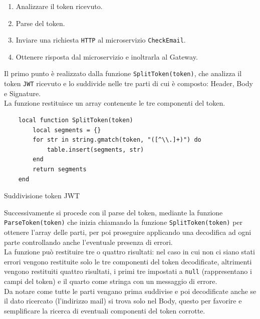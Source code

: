 \begin{enumerate}
	\item Analizzare il token ricevuto.
	\item Parse del token.
	\item Inviare una richiesta \texttt{HTTP} al microservizio \texttt{CheckEmail}.
	\item Ottenere risposta dal microservizio e inoltrarla al Gateway.
\end{enumerate}

Il primo punto è realizzato dalla funzione \texttt{SplitToken(token)}, che analizza il token \texttt{JWT} ricevuto e lo suddivide nelle tre parti di cui è composto: Header, Body e Signature.\\
La funzione restituisce un array contenente le tre componenti del token.

\begin{algorithm}
\centering
\begin{verbatim}
	local function SplitToken(token)
		local segments = {}
		for str in string.gmatch(token, "([^\\.]+)") do
			table.insert(segments, str)
		end
		return segments
	end
\end{verbatim}
\caption{Suddivisione token JWT}\label{alg:splittoken}
\end{algorithm}

Successivamente si procede con il parse del token, mediante la funzione \texttt{ParseToken(token)} che inizia chiamando la funzione \texttt{SplitToken(token)}
per ottenere l'array delle parti, per poi proseguire applicando una decodifica ad ogni parte controllando anche l'eventuale presenza di errori.\\
La funzione può restituire tre o quattro risultati: nel caso in cui non ci siano stati errori vengono restituite solo le tre componenti del token decodificate, altrimenti 
vengono restituiti quattro risultati, i primi tre impostati a \texttt{null} (rappresentano i campi del token) e il quarto come stringa con un messaggio di errore.\\
Da notare come tutte le parti vengano prima suddivise e poi decodificate anche se il dato ricercato (l'indirizzo mail) si trova solo nel Body, questo per favorire e semplificare 
la ricerca di eventuali componenti del token corrotte.

